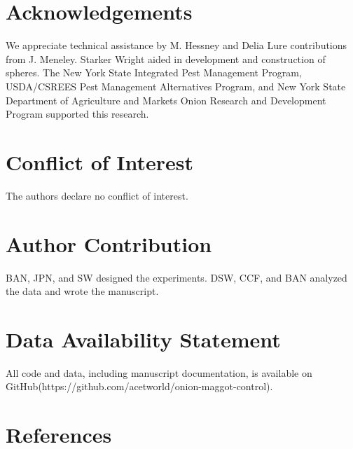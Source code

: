 \documentclass[alpha-refs]{wiley-article}
\begin{document}
\section*{Acknowledgements}
We appreciate technical assistance by M. Hessney and Delia Lure contributions from J. Meneley. Starker Wright aided in development and construction of spheres.  The New York State Integrated Pest Management Program, USDA/CSREES Pest Management Alternatives Program, and New York State Department of Agriculture and Markets Onion Research and Development Program supported this research. 

\section*{Conflict of Interest}
The authors declare no conflict of interest.  

\section*{Author Contribution}
BAN, JPN, and SW designed the experiments.  DSW, CCF, and BAN analyzed the data and wrote the manuscript.  


\section*{Data Availability Statement}
All code and data, including manuscript documentation, is available on GitHub(https://github.com/acetworld/onion-maggot-control).



\section{References}




\end{document}
